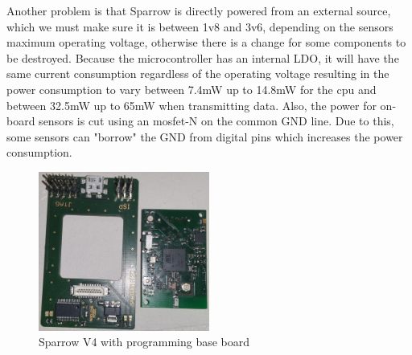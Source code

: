 Another problem is that Sparrow is directly powered from an external source, which we must make
sure it is between 1v8 and 3v6, depending on the sensors maximum operating voltage, otherwise there
is a change for some components to be destroyed. Because the
microcontroller has an internal LDO, it will have the same current consumption regardless of the
operating voltage resulting in the power consumption to vary between 7.4mW up to 14.8mW for the cpu
and between 32.5mW up to 65mW when transmitting data. Also, the power for on-board sensors is cut
using an mosfet-N on the common GND line. Due to this, some sensors can "borrow" the GND from
digital pins which increases the power consumption.
\begin{figure}[ht] \centering
\includegraphics[width=0.5\textwidth]{img/sparrowv4.jpg}
\caption{Sparrow V4 with programming base board}
\end{figure}



